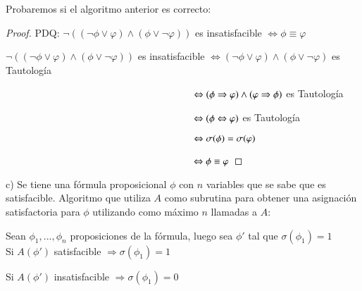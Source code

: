 \documentclass[
	spanish, %
	letterpaper, oneside
]{article}
\begin{document}
Probaremos si el algoritmo anterior es correcto:

\begin{proof}
    PDQ: $\neg ((\neg \phi \vee \varphi)\land(\phi \vee \neg \varphi))$ es insatisfacible $\Leftrightarrow \phi \equiv \varphi$

    $\neg ((\neg \phi \vee \varphi)\land(\phi \vee \neg \varphi))$ es insatisfacible $\Leftrightarrow (\neg \phi \vee \varphi)\land(\phi \vee \neg \varphi)$ es Tautología

    $\hspace{67mm} \Leftrightarrow (\phi \Rightarrow \varphi) \land (\varphi \Rightarrow \phi)$ es Tautología

    $\hspace{67mm} \Leftrightarrow (\phi \Leftrightarrow \varphi)$ es Tautología

    $\hspace{67mm} \Leftrightarrow \sigma(\phi) = \sigma(\varphi)$

    $\hspace{67mm} \Leftrightarrow \phi \equiv \varphi$
    
\end{proof}

\newpage

c) Se tiene una fórmula proposicional $\phi$ con $n$ variables que se sabe que es satisfacible. Algoritmo que utiliza $A$ como subrutina para obtener una asignación satisfactoria para $\phi$ utilizando como máximo $n$ llamadas a $A$:

Sean $\phi_1,...,\phi_n$ proposiciones de la fórmula, luego sea $\phi '$ tal que $\sigma(\phi_1)=1$\\

Si $A(\phi')$ satisfacible $\Rightarrow \sigma(\phi_1)=1$

Si $A(\phi')$ insatisfacible $\Rightarrow \sigma(\phi_1)=0$\\
\end{document}
